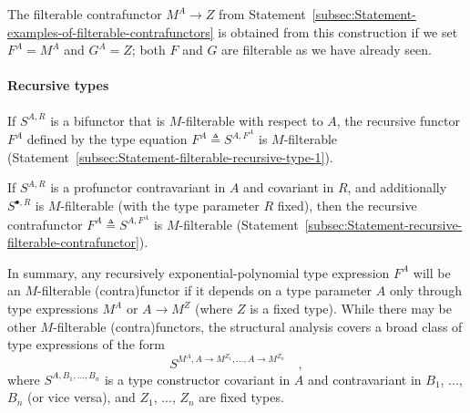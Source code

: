The filterable contrafunctor $M^{A}\rightarrow Z$ from Statement~\ref{subsec:Statement-examples-of-filterable-contrafunctors}
is obtained from this construction if we set $F^{A}=M^{A}$ and $G^{A}=Z$;
both $F$ and $G$ are filterable as we have already seen.

\paragraph{Recursive types}

If $S^{A,R}$ is a bifunctor that is $M$-filterable with respect
to $A$, the recursive functor $F^{A}$ defined by the type equation
$F^{A}\triangleq S^{A,F^{A}}$ is $M$-filterable (Statement~\ref{subsec:Statement-filterable-recursive-type-1}).

If $S^{A,R}$ is a profunctor contravariant in
$A$ and covariant in $R$, and additionally $S^{\bullet,R}$ is $M$-filterable
(with the type parameter $R$ fixed), then the recursive contrafunctor
$F^{A}\triangleq S^{A,F^{A}}$ is $M$-filterable (Statement~\ref{subsec:Statement-recursive-filterable-contrafunctor}).

In summary, any recursively exponential-polynomial type expression
$F^{A}$ will be an $M$-filterable (contra)functor if it depends
on a type parameter $A$ only through type expressions $M^{A}$ or
$A\rightarrow M^{Z}$ (where $Z$ is a fixed type). While there may
be other $M$-filterable (contra)functors, the structural analysis
covers a broad class of type expressions of the form
\[
S^{M^{A},A\rightarrow M^{Z_{1}},...,A\rightarrow M^{Z_{n}}}\quad,
\]
where $S^{A,B_{1},...,B_{n}}$ is a type constructor covariant in
$A$ and contravariant in $B_{1}$, ..., $B_{n}$ (or vice versa),
and $Z_{1}$, ..., $Z_{n}$ are fixed types. 

